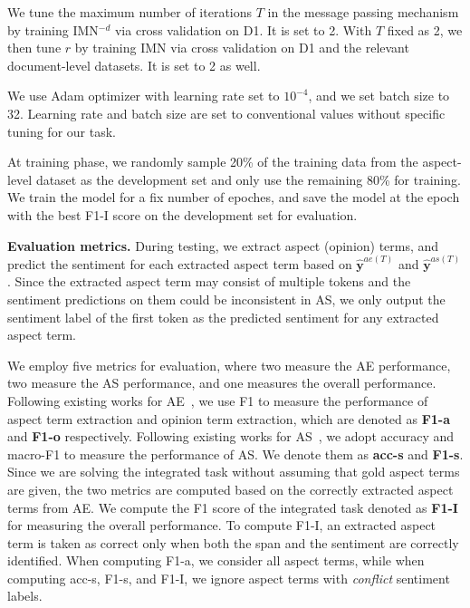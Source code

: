 \documentclass[11pt,a4paper]{article}
\begin{document}
We tune the maximum number of iterations $T$ in the message passing mechanism by training IMN$^{-d}$ via cross validation on D1. It is set to 2. With $T$ fixed as 2, we then tune $r$ by training IMN via cross validation on D1 and the relevant document-level datasets. It is set to 2 as well. 

We use Adam optimizer with learning rate set to $10^{-4}$, and we set batch size to 32. Learning rate and batch size are set to conventional values without specific tuning for our task. 

At training phase, we randomly sample 20\% of the training data from the aspect-level dataset as the development set and only use the remaining 80\% for training. We train the model for a fix number of epoches, and save the model at the epoch with the best F1-I score on the development set for evaluation. 
\medskip


\noindent\textbf{Evaluation metrics.} 
During testing, we extract aspect (opinion) terms, and predict the sentiment for each extracted aspect term based on $\hat{\mathbf{y}}^{ae(T)}$ and $\hat{\mathbf{y}}^{as(T)}$. Since the extracted aspect term may consist of multiple tokens and the sentiment predictions on them could be inconsistent in AS, we only output the sentiment label of the first token as the predicted sentiment for any extracted aspect term. 

We employ five metrics for evaluation, where two measure the AE performance, two measure the AS performance, and one measures the overall performance. 
Following existing works for AE~\citep{Wang:17, hu:18}, we use F1 to measure the performance of aspect term extraction and opinion term extraction, which are denoted as \textbf{F1-a} and \textbf{F1-o} respectively. 
Following existing works for AS~\citep{Chen:17, He:18}, we adopt accuracy and macro-F1 to measure the performance of AS. We denote them as \textbf{acc-s} and \textbf{F1-s}. Since we are solving the integrated task without assuming that gold aspect terms are given, the two metrics are computed based on the correctly extracted aspect terms from AE.  
We compute the F1 score of the integrated task denoted as \textbf{F1-I} for measuring the overall performance. To compute F1-I, an extracted aspect term is taken as correct only when both the span and the sentiment are correctly identified. When computing F1-a, we consider all aspect terms, while when computing acc-s, F1-s, and F1-I, we ignore aspect terms with \emph{conflict} sentiment labels.
\end{document}
